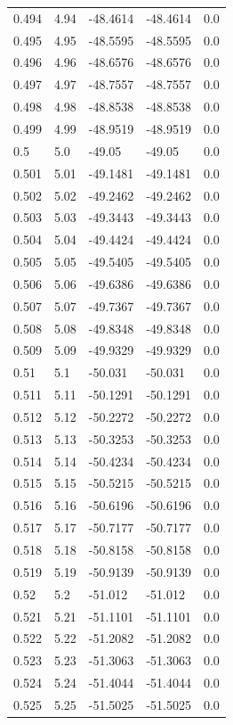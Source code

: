 \begin{tabular}{lllll}
0.494 & 4.94 & -48.4614 & -48.4614 & 0.0 \\
0.495 & 4.95 & -48.5595 & -48.5595 & 0.0 \\
0.496 & 4.96 & -48.6576 & -48.6576 & 0.0 \\
0.497 & 4.97 & -48.7557 & -48.7557 & 0.0 \\
0.498 & 4.98 & -48.8538 & -48.8538 & 0.0 \\
0.499 & 4.99 & -48.9519 & -48.9519 & 0.0 \\
0.5 & 5.0 & -49.05 & -49.05 & 0.0 \\
0.501 & 5.01 & -49.1481 & -49.1481 & 0.0 \\
0.502 & 5.02 & -49.2462 & -49.2462 & 0.0 \\
0.503 & 5.03 & -49.3443 & -49.3443 & 0.0 \\
0.504 & 5.04 & -49.4424 & -49.4424 & 0.0 \\
0.505 & 5.05 & -49.5405 & -49.5405 & 0.0 \\
0.506 & 5.06 & -49.6386 & -49.6386 & 0.0 \\
0.507 & 5.07 & -49.7367 & -49.7367 & 0.0 \\
0.508 & 5.08 & -49.8348 & -49.8348 & 0.0 \\
0.509 & 5.09 & -49.9329 & -49.9329 & 0.0 \\
0.51 & 5.1 & -50.031 & -50.031 & 0.0 \\
0.511 & 5.11 & -50.1291 & -50.1291 & 0.0 \\
0.512 & 5.12 & -50.2272 & -50.2272 & 0.0 \\
0.513 & 5.13 & -50.3253 & -50.3253 & 0.0 \\
0.514 & 5.14 & -50.4234 & -50.4234 & 0.0 \\
0.515 & 5.15 & -50.5215 & -50.5215 & 0.0 \\
0.516 & 5.16 & -50.6196 & -50.6196 & 0.0 \\
0.517 & 5.17 & -50.7177 & -50.7177 & 0.0 \\
0.518 & 5.18 & -50.8158 & -50.8158 & 0.0 \\
0.519 & 5.19 & -50.9139 & -50.9139 & 0.0 \\
0.52 & 5.2 & -51.012 & -51.012 & 0.0 \\
0.521 & 5.21 & -51.1101 & -51.1101 & 0.0 \\
0.522 & 5.22 & -51.2082 & -51.2082 & 0.0 \\
0.523 & 5.23 & -51.3063 & -51.3063 & 0.0 \\
0.524 & 5.24 & -51.4044 & -51.4044 & 0.0 \\
0.525 & 5.25 & -51.5025 & -51.5025 & 0.0 \\

\end{tabular}
